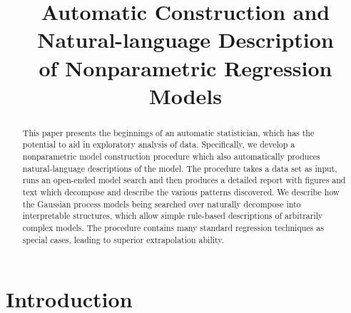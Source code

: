 \documentclass[letterpaper]{article}
\begin{document}
%
\title{Automatic Construction and Natural-language Description \\ of Nonparametric Regression Models}
\author{}
\maketitle






\begin{abstract} 
This paper presents the beginnings of an automatic statistician, which has the potential to aid in exploratory analysis of data.
Specifically, we develop a nonparametric model construction procedure which also automatically produces natural-language descriptions of the model.
The procedure takes a data set as input, runs an open-ended model search and then produces a detailed report with figures and text which decompose and describe the various patterns discovered.
We describe how the Gaussian process models being searched over naturally decompose into interpretable structures, which allow simple rule-based descriptions of arbitrarily complex models.
The procedure contains many standard regression techniques as special cases, leading to superior extrapolation ability.
\end{abstract} 


\section{Introduction}
\end{document}
